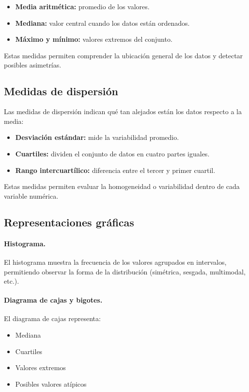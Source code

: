 \documentclass[12pt,a4paper]{article}
\begin{document}
\begin{itemize}
    \item \textbf{Media aritmética:} promedio de los valores.
    \item \textbf{Mediana:} valor central cuando los datos están ordenados.
    \item \textbf{Máximo y mínimo:} valores extremos del conjunto.
\end{itemize}

Estas medidas permiten comprender la ubicación general de los datos y detectar posibles asimetrías.

\subsection{Medidas de dispersión}

Las medidas de dispersión indican qué tan alejados están los datos respecto a la media:

\begin{itemize}
    \item \textbf{Desviación estándar:} mide la variabilidad promedio.
    \item \textbf{Cuartiles:} dividen el conjunto de datos en cuatro partes iguales.
    \item \textbf{Rango intercuartílico:} diferencia entre el tercer y primer cuartil.
\end{itemize}

Estas medidas permiten evaluar la homogeneidad o variabilidad dentro de cada variable numérica.

\subsection{Representaciones gráficas}

\paragraph{Histograma.}
El histograma muestra la frecuencia de los valores agrupados en intervalos, permitiendo observar la forma de la distribución (simétrica, sesgada, multimodal, etc.).

\paragraph{Diagrama de cajas y bigotes.}
El diagrama de cajas representa:
\begin{itemize}
    \item Mediana
    \item Cuartiles
    \item Valores extremos
    \item Posibles valores atípicos
\end{itemize}
\end{document}
